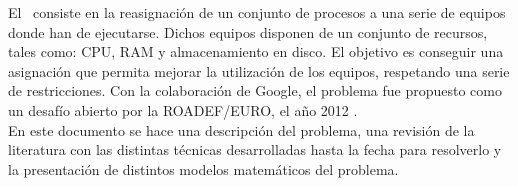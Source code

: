 El \mrp\ consiste en la reasignación de un conjunto de procesos a una serie de equipos donde han de ejecutarse. Dichos equipos disponen de un conjunto de recursos, tales como: CPU, RAM y almacenamiento en disco. El objetivo es conseguir una asignación que permita mejorar la utilización de los equipos, respetando una serie de restricciones. Con la colaboración de Google, el problema fue propuesto como un desafío abierto por la ROADEF/EURO, el año 2012 \cite{2012ProblemDefinition}. \\
En este documento se hace una descripción del problema, una revisión de la literatura con las distintas técnicas desarrolladas hasta la fecha para resolverlo y la presentación de distintos modelos matemáticos del problema.